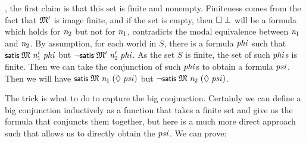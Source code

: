 \documentclass[letterpaper]{article}
\renewcommand{\HOLConst}[1]{{\textsf{\upshape\small #1}}}
\renewcommand{\HOLinline}[1]{\ensuremath{#1}}
\begin{document}
, the first claim is that this set is finite and nonempty. Finiteness comes from the fact that \HOLinline{\HOLFreeVar{\ensuremath{\mathfrak{M}'}}} is image finite, and if the set is empty, then \HOLinline{\HOLSymConst{\ensuremath{\Box}}\;\HOLSymConst{\ensuremath{\bot}}} will be a formula which holds for \HOLinline{\HOLFreeVar{n\sb{\mathrm{2}}}} but not for \HOLinline{\HOLFreeVar{n\sb{\mathrm{1}}}}, contradicts the modal equivalence between \HOLinline{\HOLFreeVar{n\sb{\mathrm{1}}}} and \HOLinline{\HOLFreeVar{n\sb{\mathrm{2}}}}. By assumption, for each world in $S$, there is a formula \HOLinline{\HOLFreeVar{phi}} such that \HOLinline{\HOLConst{satis}\;\HOLFreeVar{\ensuremath{\mathfrak{M}}}\;\HOLFreeVar{n\sb{\mathrm{1}}\sp{\prime}}\;\HOLFreeVar{phi}} but \HOLinline{\HOLSymConst{\HOLTokenNeg{}}\HOLConst{satis}\;\HOLFreeVar{\ensuremath{\mathfrak{M}'}}\;\HOLFreeVar{n\sb{\mathrm{2}}\sp{\prime}}\;\HOLFreeVar{phi}}. As the set $S$ is finite, the set of such \HOLinline{\HOLFreeVar{phi}}s is finite. Then we can take the conjunction of such \HOLinline{\HOLFreeVar{phi}}s to obtain a formula \HOLinline{\HOLFreeVar{psi}}. Then we will have \HOLinline{\HOLConst{satis}\;\HOLFreeVar{\ensuremath{\mathfrak{M}}}\;\HOLFreeVar{n\sb{\mathrm{1}}}\;(\HOLSymConst{\ensuremath{\Diamond}}\;\HOLFreeVar{psi})} but \HOLinline{\HOLSymConst{\HOLTokenNeg{}}\HOLConst{satis}\;\HOLFreeVar{\ensuremath{\mathfrak{M}}}\;\HOLFreeVar{n\sb{\mathrm{2}}}\;(\HOLSymConst{\ensuremath{\Diamond}}\;\HOLFreeVar{psi})}.

The trick is what to do to capture the big conjunction. Certainly we can define a big conjunction inductively as a function that takes a finite set and give us the formula that conjuncts them together, but here is a much more direct approach such that allows us to directly obtain the \HOLinline{\HOLFreeVar{psi}}. We can prove:
\end{document}
